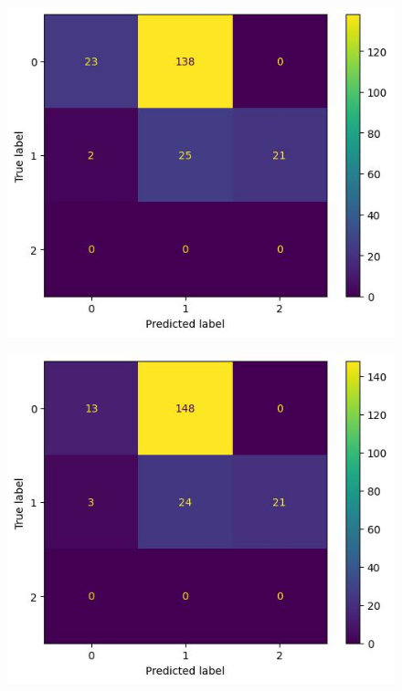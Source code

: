 \documentclass[11pt,titlepage,oneside,openany]{book}
\begin{document}
\begin{figure}[t]
	\centering
	\begin{minipage}{.45\textwidth}
		\centering
		\includegraphics[width=\textwidth]{figures/confusion_matrix_one_step.jpg}
		\label{fig:conf:sub1}
	\end{minipage}\hfill
	\begin{minipage}{.45\textwidth}
		\centering
		\includegraphics[width=\textwidth]{figures/confusion_matrix_two_step.jpg}
		\label{fig:conf:sub2}
	\end{minipage}
\end{figure}
\end{document}
